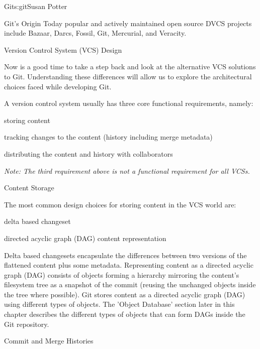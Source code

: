 \begin{aosachapter}{Git}{s:git}{Susan Potter}
\begin{aosasect1}{Git's Origin}
Today popular and actively maintained open source DVCS projects include
Bazaar, Darcs, Fossil, Git, Mercurial, and Veracity.

\end{aosasect1}

\begin{aosasect1}{Version Control System (VCS) Design}

Now is a good time to take a step back and look at the alternative VCS
solutions to Git. Understanding these differences will allow us to explore
the architectural choices faced while developing Git.

A version control system usually has three core functional
requirements, namely:
\begin{aosaitemize}
  \item storing content
  \item tracking changes to the content (history including merge metadata)
  \item distributing the content and history with collaborators
\end{aosaitemize}

\emph{Note: The third requirement above is not a functional requirement for
all VCSs.}

\begin{aosasect2}{Content Storage}

The most common design choices for storing content in the VCS world are:
\begin{aosaitemize}
  \item delta based changeset
  \item directed acyclic graph (DAG) content representation
\end{aosaitemize}

Delta based changesets encapsulate the differences between two versions of
the flattened content plus some metadata. Representing content as a
directed acyclic graph (DAG) consists of objects forming a hierarchy
mirroring the content's filesystem tree as a snapshot of the commit (reusing
the unchanged objects inside the tree where possible). Git stores content as
a directed acyclic graph (DAG) using different types of objects. The
'Object Database' section later in this chapter describes the different
types of objects that can form DAGs inside the Git repository.

\end{aosasect2}
\begin{aosasect2}{Commit and Merge Histories}


\end{aosasect2}
\end{aosasect1}
\end{aosachapter}
